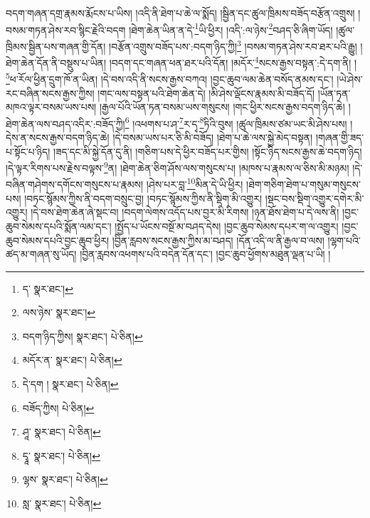བདག་གཞན་དགྲ་རྣམས་རྨོངས་པ་ཡིས། །འདི་ནི་ཐེག་པ་ཆེ་ལ་སྨོད། །སྦྱིན་དང་ཚུལ་ཁྲིམས་བཟོད་བརྩོན་འགྲུས། །བསམ་གཏན་ཤེས་རབ་སྙིང་རྗེའི་བདག །ཐེག་ཆེན་ཡིན་ན་དེ་\footnote{ད་  སྣར་ཐང་། }ཡི་ཕྱིར། །འདི་:ལ་ཉེས་\footnote{ལས་ཉེས་  སྣར་ཐང་། }བཤད་ཅི་ཞིག་ཡོད། །ཚུལ་ཁྲིམས་སྦྱིན་པས་གཞན་གྱི་དོན། །བརྩོན་འགྲུས་བཟོད་པས་:བདག་ཉིད་ཀྱི།\footnote{བདག་ཉིད་ཀྱིས།  སྣར་ཐང་།  པེ་ཅིན། } །བསམ་གཏན་ཤེས་རབ་ཐར་པའི་རྒྱུ། །ཐེག་ཆེན་དོན་ནི་བསྡུས་པ་ཡིན། །བདག་དང་གཞན་ཕན་ཐར་པའི་དོན། །མདོར་\footnote{མདོར་ན་  སྣར་ཐང་།  པེ་ཅིན། }སངས་རྒྱས་བསྟན་:དེ་དག་ནི། །\footnote{དེ་དག །  སྣར་ཐང་།  པེ་ཅིན། }ཕ་རོལ་ཕྱིན་དྲུག་ཁོ་ན་ཡིན། །དེ་བས་འདི་ནི་སངས་རྒྱས་བཀའ། །བྱང་ཆུབ་ལམ་ཆེན་བསོད་ནམས་དང་། །ཡེ་ཤེས་རང་བཞིན་སངས་རྒྱས་ཀྱིས། །གང་ལས་བསྟན་པའི་ཐེག་ཆེན་དེ། །མི་ཤེས་ལྡོངས་རྣམས་མི་བཟོད་དོ། །ཡོན་ཏན་མཁའ་ལྟར་བསམ་ཡས་པས། །རྒྱལ་པོའི་ཡོན་ཏན་བསམ་ཡས་གསུངས། །གང་ཕྱིར་སངས་རྒྱས་བདག་ཉིད་ཆེ། །ཐེག་ཆེན་ལས་བཤད་འདིར་:བཟོད་ཀྱི།\footnote{བཟོད་ཀྱིས།  པེ་ཅིན། } །འཕགས་པ་ཤ་\footnote{ཤཱ་  སྣར་ཐང་།  པེ་ཅིན། }ར་དྭ་\footnote{དྭཱ་  སྣར་ཐང་།  པེ་ཅིན། }ཏིའི་བུས། །ཚུལ་ཁྲིམས་ཙམ་ཡང་མི་ཤེས་པས། །དེས་ན་སངས་རྒྱས་བདག་ཉིད་ཆེ། །དེ་བསམ་ཡས་པར་ཅི་མི་བཟོད། །ཐེག་པ་ཆེ་ལས་སྐྱེ་མེད་བསྟན། །གཞན་གྱི་ཟད་པ་སྟོང་པ་ཉིད། །ཟད་དང་མི་སྐྱེ་དོན་དུ་ནི། །གཅིག་པས་དེ་ཕྱིར་བཟོད་པར་གྱིས། །སྟོང་ཉིད་སངས་རྒྱས་ཆེ་བདག་ཉིད། །དེ་ལྟར་རིགས་པས་རྗེས་བལྟས་\footnote{ལྷས་  སྣར་ཐང་།  པེ་ཅིན། }ན། །ཐེག་ཆེན་ཅིག་ཤོས་ལས་གསུངས་པ། །མཁས་པ་རྣམས་ལ་ཅིས་མི་མཉམ། །དེ་བཞིན་གཤེགས་དགོངས་གསུངས་པ་རྣམས། །ཤེས་པར་བླ་\footnote{སླ་  སྣར་ཐང་།  པེ་ཅིན། }མིན་དེ་ཡི་ཕྱིར། །ཐེག་གཅིག་ཐེག་པ་གསུམ་གསུངས་པས། །བཏང་སྙོམས་ཀྱིས་ནི་བདག་བསྲུང་བྱ། །བཏང་སྙོམས་ཀྱིས་ནི་སྡིག་མི་འགྱུར། །སྡང་བས་སྡིག་འགྱུར་དགེར་མི་འགྱུར། །དེ་བས་ཐེག་ཆེན་ཞེ་སྡང་བ། །བདག་ལེགས་འདོད་པས་བྱར་མི་རིགས། །ཉན་ཐོས་ཐེག་པ་དེ་ལས་ནི། །བྱང་ཆུབ་སེམས་དཔའི་སྨོན་ལམ་དང་། །སྤྱོད་པ་ཡོངས་བསྔོ་མ་བཤད་དེས། །བྱང་ཆུབ་སེམས་དཔར་ག་ལ་འགྱུར། །བྱང་ཆུབ་སེམས་དཔའི་བྱང་ཆུབ་ཕྱིར། །བྱིན་རླབས་སངས་རྒྱས་ཀྱིས་མ་བཤད། །དོན་འདི་ལ་ནི་རྒྱལ་བ་ལས། །ལྷག་པའི་ཚད་མ་གཞན་སུ་ཡོད། །བྱིན་རླབས་འཕགས་པའི་བདེན་དོན་དང་། །བྱང་ཆུབ་ཕྱོགས་མཐུན་ལྡན་པ་ཡི། །
